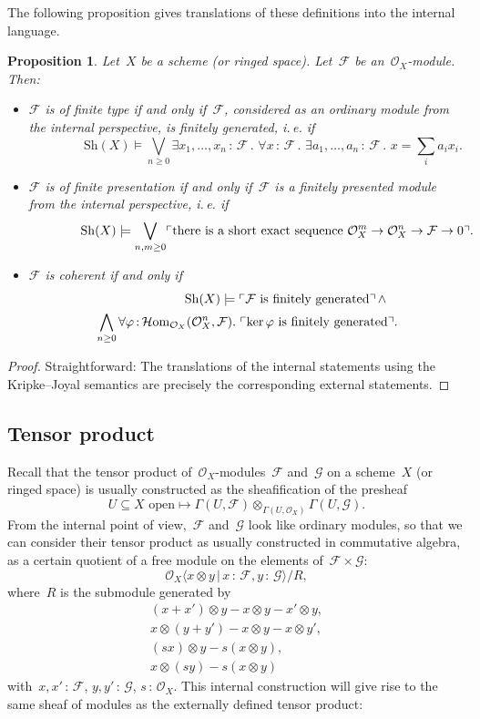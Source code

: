\documentclass[10pt]{amsart}
\makeatletter
\theoremstyle{definition}
\theoremstyle{plain}
\newtheorem{prop}[defn]{Proposition}
\theoremstyle{remark}
\newcommand{\F}{\mathcal{F}}
\newcommand{\G}{\mathcal{G}}
\renewcommand{\O}{\mathcal{O}}
\newcommand{\HOM}{\mathcal{H}\mathrm{om}}
\newcommand{\Sh}{\mathrm{Sh}}
\DeclareMathOperator{\Kernel}{ker}
\newcommand{\?}{\,{:}\,}
\renewcommand{\_}{\mathpunct{.}\,}
\newcommand{\speak}[1]{\ulcorner\text{\textnormal{#1}}\urcorner}
\newcommand{\ie}{i.\,e.\@\xspace}
\makeatother
\begin{document}
The following proposition gives translations of these definitions into the
internal language.
\begin{prop}Let~$X$ be a scheme (or ringed space). Let~$\F$ be
an~$\O_X$-module. Then:
\begin{itemize}
\item $\F$ is of finite type if and only if~$\F$, considered as an ordinary
module from the internal perspective, is finitely generated, \ie if
\[ {\qquad\qquad} \Sh(X) \models
  \bigvee_{n \geq 0}
  \exists x_1,\ldots,x_n\?\F\_
  \forall x\?\F\_
  \exists a_1,\ldots,a_n\?\F\_
  x = \textstyle\sum\limits_i a_i x_i. \]
\item $\F$ is of finite presentation if and only if~$\F$ is a finitely
presented module from the internal perspective, \ie if
\[ {\qquad\qquad} \Sh(X) \models \bigvee_{n,m \geq 0}
  \speak{there is a short exact sequence $\O_X^m \to \O_X^n \to \F \to 0$}.
  \]
\item $\F$ is coherent if and only if
\begin{multline*}
{\qquad\qquad\qquad}
  \Sh(X) \models \speak{$\F$ is finitely generated} \mathop{\wedge} \\
  \bigwedge_{n \geq 0} \forall \varphi \? \HOM_{\O_X}(\O_X^n,\F)\_
  \speak{$\Kernel \varphi$ is finitely generated}.
\end{multline*}
\end{itemize}
\end{prop}
\begin{proof}Straightforward: The translations of the internal statements using
the Kripke--Joyal semantics are precisely the corresponding external
statements.
\end{proof}


\subsection{Tensor product} Recall that the tensor product
of~$\O_X$-modules~$\F$ and~$\G$ on a scheme~$X$ (or ringed space) is usually
constructed as the sheafification of the presheaf
\[ \text{$U \subseteq X$ open} \longmapsto \Gamma(U,\F) \otimes_{\Gamma(U,\O_X)}
\Gamma(U,\G). \]
From the internal point of view,~$\F$ and~$\G$ look like ordinary modules, so
that we can consider their tensor product as usually constructed in
commutative algebra, as a certain quotient of a free module on the elements
of~$\F \times \G$:
\[ \O_X\langle x \otimes y \,|\, x\?\F, y\?\G \rangle / R, \]
where~$R$ is the submodule generated by
\begin{gather*}
  (x+x') \otimes y - x \otimes y - x' \otimes y, \\
  x \otimes (y+y') - x \otimes y - x \otimes y', \\
  (sx) \otimes y - s(x \otimes y), \\
  x \otimes (sy) - s(x \otimes y)
\end{gather*}
with~$x,x'\?\F$, $y,y'\?\G$, $s\?\O_X$.
This internal construction will give rise to the same sheaf
of modules as the externally defined tensor product:
\end{document}
